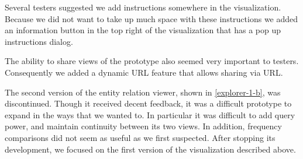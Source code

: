 Several testers suggested we add instructions somewhere in the visualization. Because we did not want to take up much space with these instructions we added an information button in the top right of the visualization that has a pop up instructions dialog.

The ability to share views of the prototype also seemed very important to testers. Consequently we added a dynamic URL feature that allows sharing via URL.

The second version of the entity relation viewer, shown in \ref{explorer-1-b}, was discontinued. Though it received decent feedback, it was a difficult prototype to expand in the ways that we wanted to. In particular it was difficult to add query power, and maintain continuity between its two views. In addition, frequency comparisons did not seem as useful as we first suspected. After stopping its development, we focused on the first version of the visualization described above.
